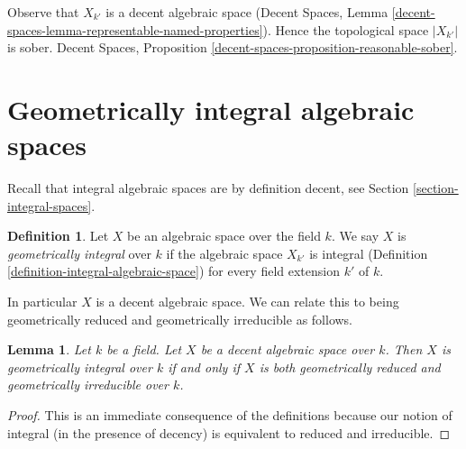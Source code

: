 \documentclass{stacks-project}
\theoremstyle{plain}
\newtheorem{lemma}[subsection]{Lemma}
\theoremstyle{definition}
\newtheorem{definition}[subsection]{Definition}
\theoremstyle{remark}
\numberwithin{equation}{subsection}
\begin{document}
\noindent
Observe that $X_{k'}$ is a decent algebraic space
(Decent Spaces, Lemma
\ref{decent-spaces-lemma-representable-named-properties}).
Hence the topological space $|X_{k'}|$ is sober.
Decent Spaces, Proposition \ref{decent-spaces-proposition-reasonable-sober}.





\section{Geometrically integral algebraic spaces}
\label{section-geometrically-integral}

\noindent
Recall that integral algebraic spaces are by definition decent, see
Section \ref{section-integral-spaces}.

\begin{definition}
\label{definition-geometrically-integral}
Let $X$ be an algebraic space over the field $k$. We say $X$ is
{\it geometrically integral} over $k$ if the algebraic space
$X_{k'}$ is integral (Definition \ref{definition-integral-algebraic-space})
for every field extension $k'$ of $k$.
\end{definition}

\noindent
In particular $X$ is a decent algebraic space.
We can relate this to being geometrically reduced and
geometrically irreducible as follows.

\begin{lemma}
\label{lemma-geometrically-integral}
Let $k$ be a field. Let $X$ be a decent algebraic space over $k$.
Then $X$ is geometrically integral over $k$ if and only if
$X$ is both geometrically reduced and geometrically irreducible
over $k$.
\end{lemma}

\begin{proof}
This is an immediate consequence of the definitions because our
notion of integral (in the presence of decency) is equivalent to
reduced and irreducible.
\end{proof}
\end{document}
